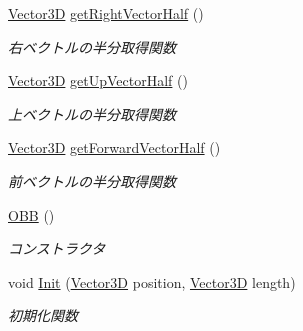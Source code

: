 \begin{DoxyCompactItemize}
\mbox{\hyperlink{class_vector3_d}{Vector3D}} \mbox{\hyperlink{class_o_b_b_ab0452e841ab2c1362b2e6365b27cea97}{get\+Right\+Vector\+Half}} ()
\begin{DoxyCompactList}\small\item\em 右ベクトルの半分取得関数 \end{DoxyCompactList}\item 
\mbox{\hyperlink{class_vector3_d}{Vector3D}} \mbox{\hyperlink{class_o_b_b_a510542bc5071eb9bd174d69ffa64f023}{get\+Up\+Vector\+Half}} ()
\begin{DoxyCompactList}\small\item\em 上ベクトルの半分取得関数 \end{DoxyCompactList}\item 
\mbox{\hyperlink{class_vector3_d}{Vector3D}} \mbox{\hyperlink{class_o_b_b_a00b6038bdcc374d3acd9ef4d002b59d0}{get\+Forward\+Vector\+Half}} ()
\begin{DoxyCompactList}\small\item\em 前ベクトルの半分取得関数 \end{DoxyCompactList}\item 
\mbox{\hyperlink{class_o_b_b_af752af068c6fc1787f06556b6a71c929}{O\+BB}} ()
\begin{DoxyCompactList}\small\item\em コンストラクタ \end{DoxyCompactList}\item 
void \mbox{\hyperlink{class_o_b_b_ae5d7ba6a226b2da4271ffd16d478d800}{Init}} (\mbox{\hyperlink{class_vector3_d}{Vector3D}} position, \mbox{\hyperlink{class_vector3_d}{Vector3D}} length)
\begin{DoxyCompactList}\small\item\em 初期化関数 \end{DoxyCompactList}\end{DoxyCompactItemize}
